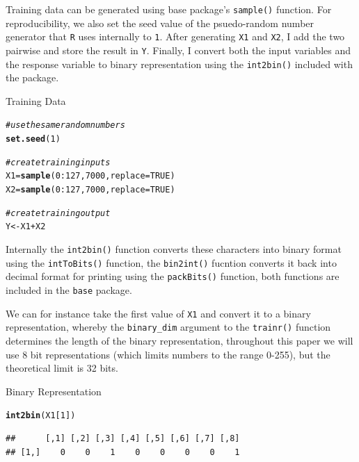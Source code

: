 \documentclass[british]{article}\usepackage[]{graphicx}\usepackage[]{color}
\makeatletter
\newcommand{\hlnum}[1]{\textcolor[rgb]{0.686,0.059,0.569}{#1}}%
\newcommand{\hlcom}[1]{\textcolor[rgb]{0.678,0.584,0.686}{\textit{#1}}}%
\newcommand{\hlopt}[1]{\textcolor[rgb]{0,0,0}{#1}}%
\newcommand{\hlstd}[1]{\textcolor[rgb]{0.345,0.345,0.345}{#1}}%
\newcommand{\hlkwb}[1]{\textcolor[rgb]{0.69,0.353,0.396}{#1}}%
\newcommand{\hlkwc}[1]{\textcolor[rgb]{0.333,0.667,0.333}{#1}}%
\newcommand{\hlkwd}[1]{\textcolor[rgb]{0.737,0.353,0.396}{\textbf{#1}}}%
\newenvironment{kframe}{%
 \def\at@end@of@kframe{}%
 \ifinner\ifhmode%
  \def\at@end@of@kframe{\end{minipage}}%
  \begin{minipage}{\columnwidth}%
 \fi\fi%
 \def\FrameCommand##1{\hskip\@totalleftmargin \hskip-\fboxsep
 \colorbox{shadecolor}{##1}\hskip-\fboxsep
     \hskip-\linewidth \hskip-\@totalleftmargin \hskip\columnwidth}%
 \MakeFramed {\advance\hsize-\width
   \@totalleftmargin\z@ \linewidth\hsize
   \@setminipage}}%
 {\par\unskip\endMakeFramed%
 \at@end@of@kframe}
\newenvironment{knitrout}{}{} %
\newcommand{\code}[1]{\texttt{#1}}
\makeatother
\begin{document}
Training data can be generated using base package's \code{sample()}
function. For reproducibility, we also set the seed value of the psuedo-random
number generator that \code{R} uses internally to \code{1}. After
generating \code{X1} and \code{X2}, I add the two pairwise and store
the result in \code{Y}. Finally, I convert both the input variables
and the response variable to binary representation using the \code{int2bin()}
included with the package.

\begin{table}[H]
\caption{Training Data}


\begin{knitrout}
\color{fgcolor}\begin{kframe}
\begin{alltt}
\hlcom{# use the same random numbers}
\hlkwd{set.seed}\hlstd{(}\hlnum{1}\hlstd{)}

\hlcom{# create training inputs }
\hlstd{X1} \hlkwb{=} \hlkwd{sample}\hlstd{(}\hlnum{0}\hlopt{:}\hlnum{127}\hlstd{,} \hlnum{7000}\hlstd{,} \hlkwc{replace}\hlstd{=}\hlnum{TRUE}\hlstd{)}
\hlstd{X2} \hlkwb{=} \hlkwd{sample}\hlstd{(}\hlnum{0}\hlopt{:}\hlnum{127}\hlstd{,} \hlnum{7000}\hlstd{,} \hlkwc{replace}\hlstd{=}\hlnum{TRUE}\hlstd{)}

\hlcom{# create training output }
\hlstd{Y} \hlkwb{<-} \hlstd{X1} \hlopt{+} \hlstd{X2}
\end{alltt}
\end{kframe}
\end{knitrout}
\end{table}


Internally the \code{int2bin()} function converts these characters
into binary format using the \code{intToBits()} function, the \code{bin2int()}
fucntion converts it back into decimal format for printing using the
\code{packBits()} function, both functions are included in the \code{base}
package.

We can for instance take the first value of \code{X1} and convert
it to a binary representation, whereby the \code{binary\_dim} argument
to the \code{trainr()} function determines the length of the binary
representation, throughout this paper we will use 8 bit representations
(which limits numbers to the range 0-255), but the theoretical limit
is 32 bits.

\begin{table}[H]


\caption{Binary Representation}


\begin{knitrout}
\color{fgcolor}\begin{kframe}
\begin{alltt}
\hlkwd{int2bin}\hlstd{( X1[}\hlnum{1}\hlstd{] )}
\end{alltt}
\begin{verbatim}
##      [,1] [,2] [,3] [,4] [,5] [,6] [,7] [,8]
## [1,]    0    0    1    0    0    0    0    1
\end{verbatim}
\end{kframe}
\end{knitrout}

\end{table}
\end{document}

